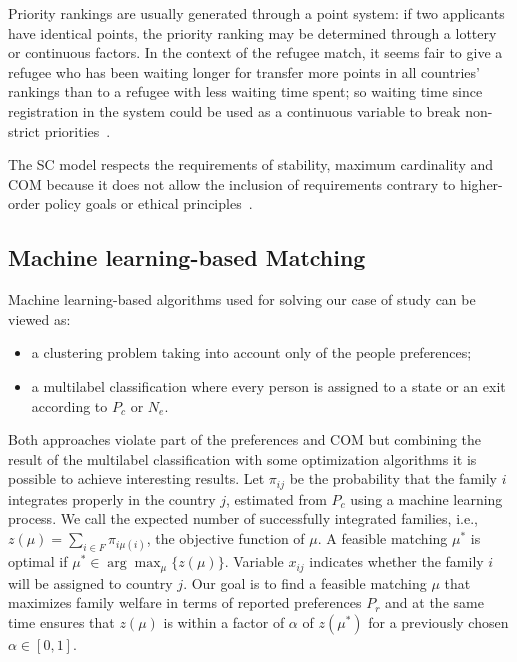 Priority rankings are usually generated through a point system: if two applicants have identical points, the priority ranking may be determined through a lottery or continuous factors.
In the context  of the refugee match, it seems fair to give a refugee who has been waiting longer for transfer  more points in all countries’ rankings than to a refugee with less waiting time spent;
so waiting time since registration in the system could be used as a continuous variable to break non-strict priorities~\cite{basshuysen}.

The SC model respects the requirements of stability, maximum cardinality and COM because it does not allow the inclusion of requirements contrary to higher-order policy goals or ethical principles~\cite{basshuysen}.


\subsection{Machine learning-based Matching}\label{machine-learning-based-matching}%
Machine learning-based algorithms used for solving our case of study can be viewed as:
\begin{itemize}
    \item a clustering problem taking into account only of the people preferences;
    \item a multilabel classification where every person is assigned to a state or an exit according to \(P_c\) or \(N_e\).
\end{itemize}
Both approaches violate part of the preferences and COM but combining the result of the multilabel classification with some optimization algorithms it is possible to achieve interesting results.
Let \(\pi_{ij}\) be the probability that the family \(i\) integrates properly in the country \(j\), estimated from \(P_c\) using a machine learning process.
We call the expected number of successfully integrated families, i.e., \(z (\mu) = \sum_{i \in F} \pi_{i \mu (i)}\), the objective function of \(\mu\). A feasible matching \(\mu^*\) is optimal if \(\mu^* \in \arg\max_{\mu} \{z (\mu)\}\).
Variable \(x_{ij}\) indicates whether the family \(i\) will be assigned to country \(j\).
Our goal is to find a feasible matching \(\mu\) that maximizes family welfare in terms of reported preferences \(P_r\) and at the same time ensures that \(z (\mu)\) is within a factor of \(\alpha\) of \(z \left( \mu^* \right) \) for a previously chosen \(\alpha \in [0,1]\).

